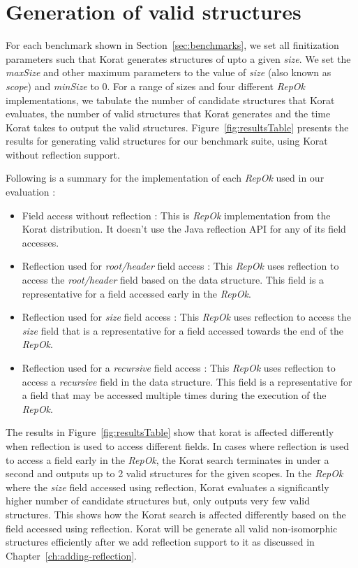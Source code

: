 \section{Generation of valid structures}
\label{sec:generation-of-valid-structures}
For each benchmark shown in Section~\ref{sec:benchmarks}, we set all
finitization parameters such that Korat generates structures of upto a
given \emph{size}. We set the \emph{maxSize} and other maximum
parameters to the value of \emph{size} (also known as \emph{scope})
and \emph{minSize} to 0. For a range of sizes and four different
\emph{RepOk} implementations, we tabulate the number of candidate
structures that Korat evaluates, the number of valid structures that
Korat generates and the time Korat takes to output the valid
structures. Figure~\ref{fig:resultsTable} presents the results for
generating valid structures for our benchmark suite, using Korat
without reflection support.

\par
\noindent Following is a summary for the implementation of each
\emph{RepOk} used in our evaluation :
\begin{itemize}
\item Field access without reflection : This is \emph{RepOk}
  implementation from the Korat distribution. It doesn't use the Java
  reflection API for any of its field accesses.
\item Reflection used for \emph{root/header} field access : This
  \emph{RepOk} uses reflection to access the \emph{root/header} field
  based on the data structure. This field is a representative for a
  field accessed early in the \emph{RepOk}.
\item Reflection used for \emph{size} field access : This \emph{RepOk}
  uses reflection to access the \emph{size} field that is a
  representative for a field accessed towards the end of the
  \emph{RepOk}.
\item Reflection used for a \emph{recursive} field access : This
  \emph{RepOk} uses reflection to access a \emph{recursive} field in
  the data structure. This field is a representative for a field that
  may be accessed multiple times during the execution of the
  \emph{RepOk}.
\end{itemize}


\para The results in Figure~\ref{fig:resultsTable} show that korat is
affected differently when reflection is used to access different
fields. In cases where reflection is used to access a field early in
the \emph{RepOk}, the Korat search terminates in under a second and
outputs up to 2 valid structures for the given scopes. In the
\emph{RepOk} where the \emph{size} field accessed using reflection,
Korat evaluates a significantly higher number of candidate structures
but, only outputs very few valid structures. This shows how the Korat
search is affected differently based on the field accessed using
reflection. Korat will be generate all valid non-isomorphic structures
efficiently after we add reflection support to it as discussed in
Chapter~\ref{ch:adding-reflection}.


